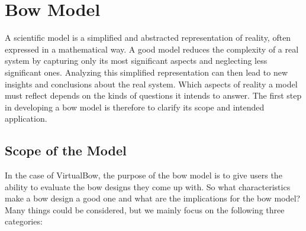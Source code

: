 
\chapter{Bow Model}
\label{chap:bow-model}

A scientific model is a simplified and abstracted representation of reality, often expressed in a mathematical way.
A good model reduces the complexity of a real system by capturing only its most significant aspects and neglecting less significant ones.
Analyzing this simplified representation can then lead to new insights and conclusions about the real system.
Which aspects of reality a model must reflect depends on the kinds of questions it intends to answer.
The first step in developing a bow model is therefore to clarify its scope and intended application.

\section{Scope of the Model}
\label{section:model-scope}

In the case of VirtualBow, the purpose of the bow model is to give users the ability to evaluate the bow designs they come up with.
So what characteristics make a bow design a good one and what are the implications for the bow model?
Many things could be considered, but we mainly focus on the following three categories:

